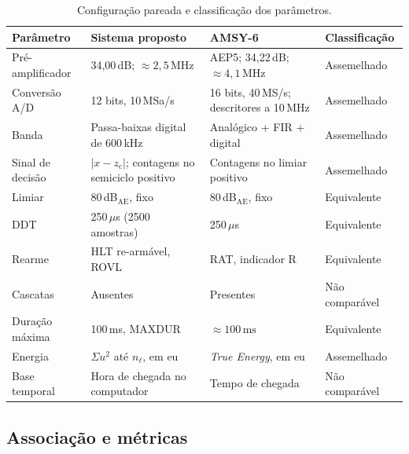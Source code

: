 \begin{table}[htbp]
	\centering
	\small
	\caption{Configuração pareada e classificação dos parâmetros.}
	\label{tab:pareada}
	\label{v2:qua:configuracao_pareada_secao5}
	\begin{tabular}{L{0.18\textwidth}L{0.30\textwidth}L{0.24\textwidth}L{0.18\textwidth}}
		\toprule
		\textbf{Parâmetro} & \textbf{Sistema proposto} & \textbf{AMSY-6} & \textbf{Classificação} \\
		\midrule
		Pré-amplificador & 34,00\,dB; \(\approx 2{,}5\,\mathrm{MHz}\) & AEP5; 34,22\,dB; \(\approx 4{,}1\,\mathrm{MHz}\) & Assemelhado \\
		Conversão A/D & 12 bits, 10\,MSa/s & 16 bits, 40\,MS/s; descritores a 10\,MHz & Assemelhado \\
		Banda & Passa-baixas digital de 600\,kHz & Analógico + FIR + digital & Assemelhado \\
		Sinal de decisão & \(|x - z_{\mathrm{c}}|\); contagens no semiciclo positivo & Contagens no limiar positivo & Assemelhado \\
		Limiar & 80\,dB\(_{\mathrm{AE}}\), fixo & 80\,dB\(_{\mathrm{AE}}\), fixo & Equivalente \\
		DDT & 250\,\(\mu\)s (2500 amostras) & 250\,\(\mu\)s & Equivalente \\
		Rearme & HLT re-armável, ROVL & RAT, indicador R & Equivalente \\
		Cascatas & Ausentes & Presentes & Não comparável \\
		Duração máxima & 100\,ms, MAXDUR & \(\approx 100\,\mathrm{ms}\) & Equivalente \\
		Energia & \(\Sigma u^2\) até \(n_\ell\), em eu & \textit{True Energy}, em eu & Assemelhado \\
		Base temporal & Hora de chegada no computador & Tempo de chegada & Não comparável \\
		\bottomrule
	\end{tabular}
\end{table}

\subsection{Associação e métricas}
\label{subsec:metricas_comparacao}
\label{v2:subsec:metricas_comparacao}

